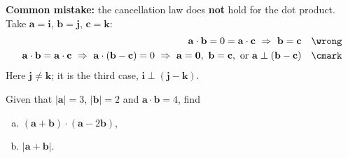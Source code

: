 \begin{mistake}
\textbf{Common mistake:} the cancellation law does \textbf{not} hold for the dot product. Take $\mathbf{a} = \mathbf{i}$, $\mathbf{b} = \mathbf{j}$, $\mathbf{c} = \mathbf{k}$:
\begin{align*}
\mathbf{a}\cdot\mathbf{b} = 0 = \mathbf{a}\cdot\mathbf{c} \ \Rightarrow\ \mathbf{b} = \mathbf{c} & & \wrong \\
\mathbf{a}\cdot\mathbf{b} = \mathbf{a}\cdot\mathbf{c} \ \Rightarrow\ \mathbf{a}\cdot(\mathbf{b}-\mathbf{c}) = 0 \ \Rightarrow\ \mathbf{a} = \mathbf{0},\ \mathbf{b} = \mathbf{c},\ \text{or } \mathbf{a}\perp(\mathbf{b}-\mathbf{c}) & & \cmark
\end{align*}
Here $\mathbf{j}\neq\mathbf{k}$; it is the third case, $\mathbf{i}\perp(\mathbf{j}-\mathbf{k})$.
\end{mistake}

\begin{example}[label=ex:2.1]
Given that $|\mathbf{a}| = 3$, $|\mathbf{b}| = 2$ and $\mathbf{a}\cdot\mathbf{b} = 4$, find
\begin{enumerate}[(a)]
  \item $(\mathbf{a}+\mathbf{b})\cdot(\mathbf{a}-2\mathbf{b})$,
  \item $|\mathbf{a}+\mathbf{b}|$.
\end{enumerate}
\end{example}

\clearpage
